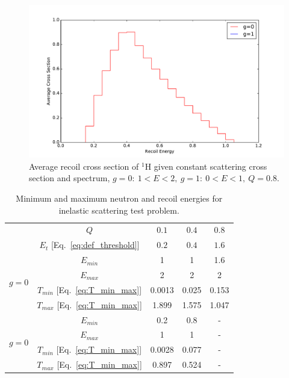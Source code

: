 \documentclass[review]{elsarticle}
\begin{document}
\begin{figure}[p]
	\centering
	\includegraphics[width=1\linewidth]{inelastic_simple_8.pdf}
	\caption{Average recoil cross section of $^1$H given constant scattering cross section and spectrum, $g=0:~ 1 < E < 2,~g=1:~ 0 < E < 1,~Q=0.8$.}
	\label{fig:inelastic_simple_8}
\end{figure}

\begin{table}[p]
\caption{Minimum and maximum neutron and recoil energies for inelastic scattering test problem.}
\centering
\begin{tabular}{c c c c c}
\toprule
 &         $Q$   & $0.1$ & $0.4$  & $0.8$ \\
 & $E_t$ [Eq.~\ref{eq:def_threshold}] &  $0.2$     &  $0.4$       & $1.6$ \\
 \midrule
 \multirow{4}{*}{$g=0$} &    $E_{min}$       &         1        &       1           &      1.6    \\
                                     &    $E_{max}$       &        2         &       2           &       2   \\
                                     &    $T_{min}$ [Eq.~\ref{eq:T_min_max}]       &         0.0013    & 0.025                   &    0.153      \\
                                     &   $T_{max}$ [Eq.~\ref{eq:T_min_max}]       &         1.899    & 1.575                   &     1.047     \\
 \midrule
 \multirow{4}{*}{$g=0$} &      $E_{min}$     &       0.2          &     0.8             &     -     \\
                                     &      $E_{max}$     &       1          &         1         &          - \\
                                     &      $T_{min}$ [Eq.~\ref{eq:T_min_max}]   &          0.0028       &    0.077              &     -     \\
                                     &     $T_{max} $ [Eq.~\ref{eq:T_min_max}]    &         0.897        &     0.524             &     -     \\
\bottomrule
\end{tabular}
\label{table:energy_limits_inelastic_simple}
\end{table}
\end{document}
